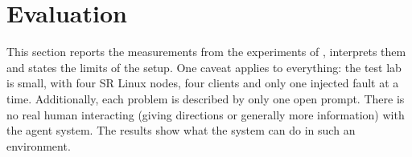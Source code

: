\section{Evaluation}
\label{sec:evaluation}

This section reports the measurements from the experiments of ,
interprets them and states the limits of the setup. One caveat applies to everything: the test
lab is small, with four SR Linux nodes, four clients and only one injected fault at a
time. Additionally, each problem is described by only one open prompt. There is no real human interacting (giving directions or generally more information)
with the agent system. The results show what the system can do in such an environment.





